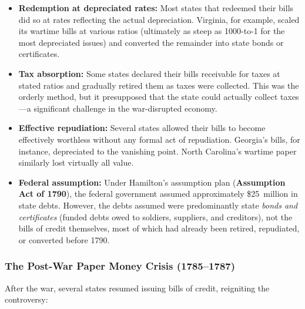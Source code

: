 \documentclass[12pt]{article}
\begin{document}
\begin{itemize}
    \item \textbf{Redemption at depreciated rates:} Most states that redeemed
    their bills did so at rates reflecting the actual depreciation.  Virginia,
    for example, scaled its wartime bills at various ratios (ultimately as
    steep as 1000-to-1 for the most depreciated issues) and converted the
    remainder into state bonds or certificates.

    \item \textbf{Tax absorption:} Some states declared their bills receivable
    for taxes at stated ratios and gradually retired them as taxes were
    collected.  This was the orderly method, but it presupposed that the state
    could actually collect taxes---a significant challenge in the
    war-disrupted economy.

    \item \textbf{Effective repudiation:} Several states allowed their bills to
    become effectively worthless without any formal act of repudiation.
    Georgia's bills, for instance, depreciated to the vanishing point.
    North Carolina's wartime paper similarly lost virtually all value.

    \item \textbf{Federal assumption:} Under Hamilton's assumption plan
    (\textbf{Assumption Act of 1790}), the federal government assumed
    approximately \$25~million in state debts.  However, the debts assumed
    were predominantly state \emph{bonds and certificates} (funded debts
    owed to soldiers, suppliers, and creditors), not the bills of credit
    themselves, most of which had already been retired, repudiated, or
    converted before 1790.
\end{itemize}

\subsubsection{The Post-War Paper Money Crisis (1785--1787)}

After the war, several states resumed issuing bills of credit, reigniting the
controversy:
\end{document}
